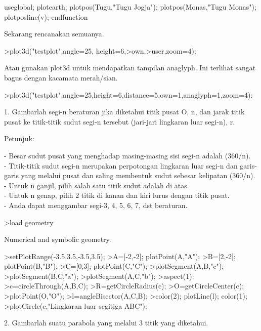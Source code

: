 \documentclass[a4paper,10pt]{article}
\begin{document}
\begin{eulernotebook}
\begin{eulercomment}
\begin{eulercomment}
\begin{eulerudf}
  useglobal;
  plotearth;
  plotpos(Tugu,"Tugu Jogja"); plotpos(Monas,"Tugu Monas");
  plotposline(v);
  endfunction
\end{eulerudf}
\begin{eulercomment}
Sekarang rencanakan semuanya.
\end{eulercomment}
\begin{eulerprompt}
>plot3d("testplot",angle=25, height=6,>own,>user,zoom=4):
\end{eulerprompt}
\begin{eulercomment}
Atau gunakan plot3d untuk mendapatkan tampilan anaglyph. Ini terlihat
sangat bagus dengan kacamata merah/sian.
\end{eulercomment}
\begin{eulerprompt}
>plot3d("testplot",angle=25,height=6,distance=5,own=1,anaglyph=1,zoom=4):
\end{eulerprompt}
\begin{eulercomment}
1. Gambarlah segi-n beraturan jika diketahui titik pusat O, n, dan
jarak titik pusat ke titik-titik sudut segi-n tersebut (jari-jari
lingkaran luar segi-n), r.

Petunjuk:

- Besar sudut pusat yang menghadap masing-masing sisi segi-n adalah
(360/n).\\
- Titik-titik sudut segi-n merupakan perpotongan lingkaran luar segi-n
dan garis-garis yang melalui pusat dan saling membentuk sudut sebesar
kelipatan (360/n).\\
- Untuk n ganjil, pilih salah satu titik sudut adalah di atas.\\
- Untuk n genap, pilih 2 titik di kanan dan kiri lurus dengan titik
pusat.\\
- Anda dapat menggambar segi-3, 4, 5, 6, 7, dst beraturan.
\end{eulercomment}
\begin{eulerprompt}
>load geometry
\end{eulerprompt}
\begin{euleroutput}
  Numerical and symbolic geometry.
\end{euleroutput}
\begin{eulerprompt}
>setPlotRange(-3.5,3.5,-3.5,3.5);
>A=[-2,-2]; plotPoint(A,"A");
>B=[2,-2]; plotPoint(B,"B");
>C=[0,3]; plotPoint(C,"C");
>plotSegment(A,B,"c");
>plotSegment(B,C,"a");
>plotSegment(A,C,"b");
>aspect(1):
>c=circleThrough(A,B,C);
>R=getCircleRadius(c);
>O=getCircleCenter(c);
>plotPoint(O,"O");
>l=angleBisector(A,C,B);
>color(2); plotLine(l); color(1);
>plotCircle(c,"Lingkaran luar segitiga ABC"):
\end{eulerprompt}
\begin{eulercomment}
2. Gambarlah suatu parabola yang melalui 3 titik yang diketahui.


\end{eulercomment}
\end{eulercomment}
\end{eulercomment}
\end{eulernotebook}
\end{document}
